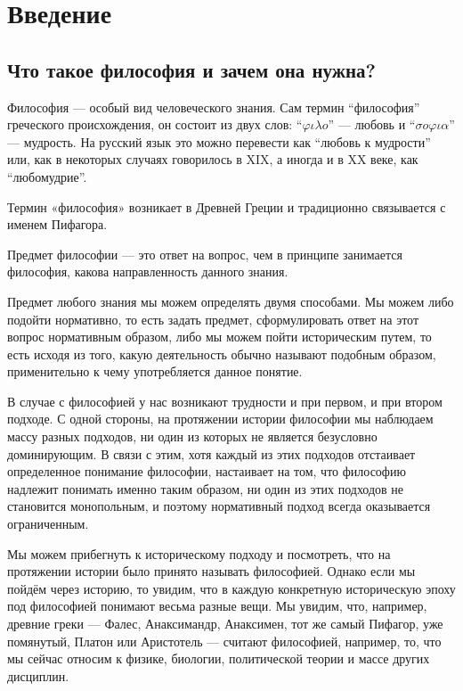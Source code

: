 \documentclass[oneside,final,14pt]{extreport}
\begin{document}
\tableofcontents

\chapter{Введение}
\section{Что такое философия и зачем она нужна?}
Философия — особый вид человеческого знания. Сам термин “философия” греческого происхождения, он состоит из двух слов: “$\varphi \iota \lambda o$” — любовь и “$\sigma o \varphi \iota \alpha$” — мудрость. На русский язык это можно перевести как “любовь к мудрости” или, как в некоторых случаях говорилось в XIX, а иногда и в XX веке, как “любомудрие”.

Термин «философия» возникает в Древней Греции и традиционно связывается с именем Пифагора.

Предмет философии — это ответ на вопрос, чем в принципе занимается философия, какова направленность данного знания.

Предмет любого знания мы можем определять двумя способами. Мы можем либо подойти нормативно, то есть задать предмет, сформулировать ответ на этот вопрос нормативным образом, либо мы можем пойти историческим путем, то есть исходя из того, какую деятельность обычно называют подобным образом, применительно к чему употребляется данное понятие.

В случае с философией у нас возникают трудности и при первом, и при втором подходе. С одной стороны, на протяжении истории философии мы наблюдаем массу разных подходов, ни один из которых не является безусловно доминирующим. В связи с этим, хотя каждый из этих подходов отстаивает определенное понимание философии, настаивает на том, что философию надлежит понимать именно таким образом, ни один из этих подходов не становится монопольным, и поэтому нормативный подход всегда оказывается ограниченным.

Мы можем прибегнуть к историческому подходу и посмотреть, что на протяжении истории было принято называть философией. Однако если мы пойдём через историю, то увидим, что в каждую конкретную историческую эпоху под философией понимают весьма разные вещи. Мы увидим, что, например, древние греки — Фалес, Анаксимандр, Анаксимен, тот же самый Пифагор, уже помянутый, Платон или Аристотель — считают философией, например, то, что мы сейчас относим к физике, биологии, политической теории и массе других дисциплин.
\end{document}
